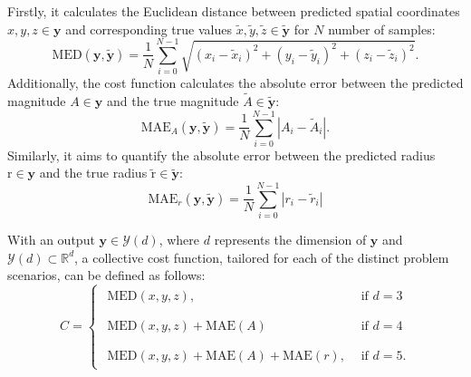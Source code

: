 \documentclass[a4paper, UKenglish, 11pt]{uiomaster}
\begin{document}
Firstly, it calculates the Euclidean distance between predicted spatial coordinates
$x, y, z \in \mathbf{y}$
and corresponding true values
$\tilde{x}, \tilde{y}, \tilde{z} \in \mathbf{\tilde{y}}$
for $N$ number of samples:
\begin{equation}
  \text{MED}(\mathbf{y}, \mathbf{\tilde{y}}) = \frac{1}{N}\sum_{i=0}^{N-1}\sqrt{(x_{i} - \tilde{x}_{i})^2 + (y_{i} - \tilde{y}_{i})^2 + (z_{i} - \tilde{z}_{i})^2}.
\end{equation}
Additionally, the cost function calculates the absolute error between the predicted magnitude ${A} \in \mathbf{y}$ and the true magnitude $\tilde{A} \in \mathbf{\tilde{y}}$:
\begin{equation}
  \text{MAE$_A$}(\mathbf{y}, \mathbf{\tilde{y}}) = \frac{1}{N} \sum_{i=0}^{N-1} | A_{i} - \tilde{A}_{i} |.
\label{eq:MAE_A}
\end{equation}
Similarly, it aims to quantify the absolute error between the predicted radius ${\text{r}} \in \mathbf{y}$ and the true radius $\tilde{\text{r}} \in \mathbf{\tilde{y}}$:
\begin{equation}
  \text{MAE$_r$}(\mathbf{y}, \mathbf{\tilde{y}}) = \frac{1}{N} \sum_{i=0}^{N-1} | r_{i} - \tilde{r}_{i} |
\label{eq:MAE_r}
\end{equation}

With an output $\textbf{y} \in \mathcal{Y}(d)$, where $d$ represents the dimension of $\textbf{y}$ and $\mathcal{Y}(d) \subset \mathbb{R}^d$, a collective cost function, tailored for each of the distinct problem scenarios, can be defined as follows:
\begin{equation}
  C =
    \begin{cases}
      \begin{array}{l}
      \text{MED}(x,y,z),
      \end{array} & \text{if } d = 3\\
      \\
      \begin{array}{l}
      \text{MED}(x,y,z) + \text{MAE}(A)
      \end{array} & \text{if } d = 4\\
      \\
      \begin{array}{l}
      \text{MED}(x,y,z) + \text{MAE}(A) + \text{MAE}(r),
      \end{array} & \text{if } d = 5.
    \end{cases}
\end{equation}
\end{document}

